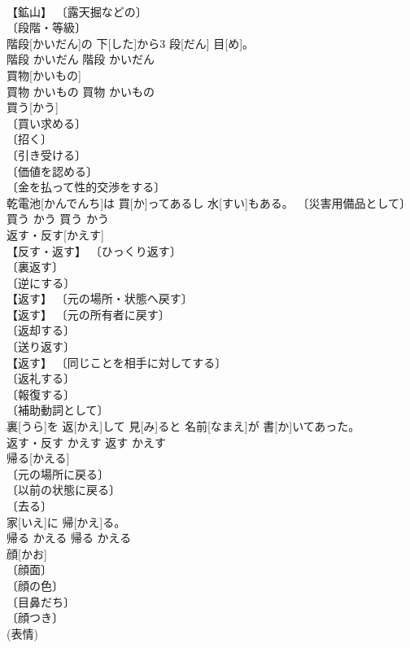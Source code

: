 \documentclass[8pt]{extreport}
\begin{document}
\begin{CJK}{UTF8}{min}
\\	【鉱山】 〔露天掘などの〕 
\\	〔段階・等級〕 
\\	階段[かいだん]の 下[した]から3 段[だん] 目[め]。	
\\	階段	かいだん	階段	かいだん	
\\	買物[かいもの]	
\\	買物	かいもの	買物	かいもの	
\\	買う[かう]	
\\	〔買い求める〕 
\\	〔招く〕 
\\	〔引き受ける〕 
\\	〔価値を認める〕 
\\	〔金を払って性的交渉をする〕 
\\	乾電池[かんでんち]は 買[か]ってあるし 水[すい]もある。	〔災害用備品として〕 
\\	買う	かう	買う	かう	
\\	返す・反す[かえす]	
\\	【反す・返す】 〔ひっくり返す〕 
\\	〔裏返す〕 
\\	〔逆にする〕 
\\	【返す】 〔元の場所・状態へ戻す〕 
\\	【返す】 〔元の所有者に戻す〕 
\\	〔返却する〕 
\\	〔送り返す〕 
\\	【返す】 〔同じことを相手に対してする〕 
\\	〔返礼する〕 
\\	〔報復する〕 
\\	〔補助動詞として〕 
\\	裏[うら]を 返[かえ]して 見[み]ると 名前[なまえ]が 書[か]いてあった。	
\\	返す・反す	かえす	返す	かえす	
\\	帰る[かえる]	
\\	〔元の場所に戻る〕 
\\	〔以前の状態に戻る〕 
\\	〔去る〕 
\\	家[いえ]に 帰[かえ]る。	
\\	帰る	かえる	帰る	かえる	
\\	顔[かお]	
\\	〔顔面〕 
\\	〔顔の色〕 
\\	〔目鼻だち〕 
\\	〔顔つき〕 
\\	(表情) 

\end{CJK}
\end{document}
